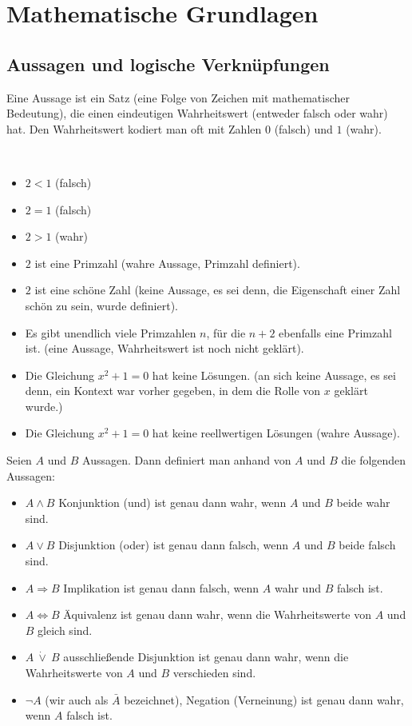 \chapter{Mathematische Grundlagen}

\section{Aussagen und logische Verknüpfungen}


\begin{defn}
Eine Aussage ist ein Satz (eine Folge von Zeichen mit mathematischer Bedeutung), die einen eindeutigen Wahrheitswert (entweder falsch oder wahr) hat. Den Wahrheitswert kodiert man oft mit Zahlen $0$ (falsch) und $1$ (wahr). 
\end{defn} 


\begin{bsp}\ 
\begin{itemize}
	\item $ 2 < 1 $ (falsch)
	\item $ 2 = 1 $ (falsch)
	\item $ 2 > 1 $ (wahr)
	\item $2$ ist eine Primzahl (wahre Aussage, Primzahl definiert). 
	\item $2$ ist eine schöne Zahl (keine Aussage, es sei denn, die Eigenschaft einer Zahl schön zu sein, wurde definiert). 
	\item Es gibt unendlich viele Primzahlen $n$, für die $n+2$ ebenfalls eine Primzahl ist. (eine Aussage, Wahrheitswert ist noch nicht geklärt). 
	\item Die Gleichung $x^2+1 =0$ hat keine Lösungen. (an sich keine Aussage, es sei denn, ein Kontext war vorher gegeben, in dem die Rolle von $x$ geklärt wurde.)
	\item Die Gleichung $x^2+1=0$ hat keine reellwertigen Lösungen (wahre Aussage). 
\end{itemize}
\end{bsp} 

\begin{defn}
Seien $ A $ und $ B $ Aussagen. Dann definiert man anhand von $ A $ und $ B $ die folgenden Aussagen:
\begin{itemize}
	\item $ A \wedge B $ Konjunktion (\glqq und\grqq) ist genau dann wahr, wenn $A$ und $B$ beide wahr sind. 
	\item $ A \vee B $ Disjunktion (\glqq oder\grqq) ist genau dann falsch, wenn $A$ und $B$ beide falsch sind. 
	\item $ A \Rightarrow B $ Implikation ist genau dann falsch, wenn $A$ wahr und $B$ falsch ist. 
	\item $ A \Leftrightarrow B $ Äquivalenz ist genau dann wahr, wenn die Wahrheitswerte von $A$ und $B$ gleich sind. 
	\item $ A \:\dot{\vee}\: B $ ausschließende Disjunktion ist genau dann wahr, wenn die Wahrheitswerte von $A$ und $B$ verschieden sind. 
	\item $ \neg A $ (wir auch als $ \bar{A} $ bezeichnet), Negation (Verneinung) ist genau dann wahr, wenn $A$ falsch ist. 
\end{itemize}
\end{defn}


